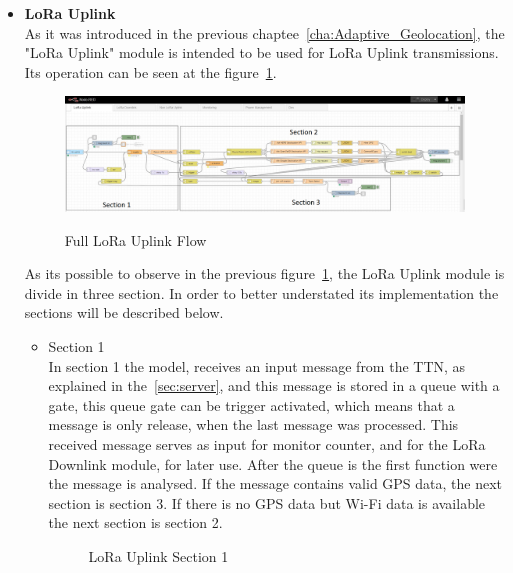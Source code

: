 \begin{itemize}
   \item \textbf{LoRa Uplink} \\
   As it was introduced in the previous chaptee~\ref{cha:Adaptive_Geolocation}, the "LoRa Uplink" module is intended to be used for LoRa Uplink transmissions. Its operation can be seen at the figure~\ref{fig:LoRa_Uplink}.
\begin{figure}[htbp]
  \centering
  
    {\includegraphics[width=\linewidth]{Chapters/Figures/LoRaUplink.png}}
 
  \caption{Full LoRa Uplink Flow}
  \label{fig:LoRa_Uplink}
\end{figure}
 
As its possible to observe in the previous figure~\ref{fig:LoRa_Uplink}, the LoRa Uplink module is divide in three section. In order to better understated its implementation the sections will be described below.

\begin{itemize}
  \item Section 1\\
    In section 1 the model, receives an input message from the TTN, as explained in the~\ref{sec:server}, and this message is stored in a queue with a gate, this queue gate can be trigger activated, which means that a message is only release, when the last message was processed. This received message serves as input for monitor counter, and for the LoRa Downlink module, for later use. After the queue is the first function were the message is analysed. If the message contains valid GPS data, the next section is section 3. If there is no GPS data but Wi-Fi data is available the next section is section 2. 
    \begin{figure}[htbp]
      \centering
      \caption{LoRa Uplink  Section 1}
      \label{fig:LoRa_Uplink_Sec1}
    \end{figure}
\end{itemize}


\end{itemize}
